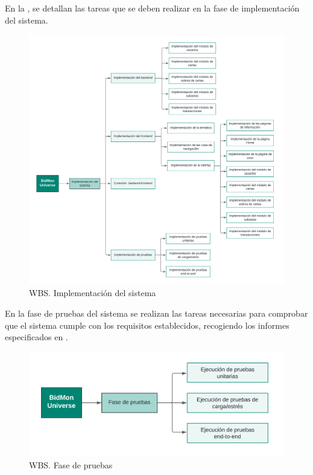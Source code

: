 En la , se detallan las tareas que se deben realizar en la fase de implementación del sistema.
\begin{figure}[H]
    \hypertarget{fig:5_WBS-Implementacion}{}
    \centering
    \includegraphics[width=0.9\linewidth]{figures/5-WBS/5_WBS-Implementacion.png}
    \caption{WBS. Implementación del sistema}
    \label{fig:5_WBS-Implementacion}
\end{figure}

En la fase de pruebas del sistema se realizan las tareas necesarias para comprobar que el sistema cumple con los requisitos establecidos, recogiendo los informes especificados en .
\begin{figure}[H]
    \hypertarget{fig:5_WBS-Pruebas}{}
    \centering
    \includegraphics[width=0.9\linewidth]{figures/5-WBS/5_WBS-Pruebas.png}
    \caption{WBS. Fase de pruebas}
    \label{fig:5_WBS-Pruebas}
\end{figure}

